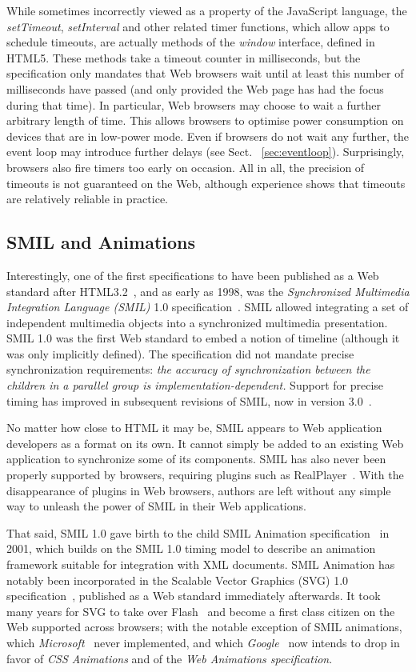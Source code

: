 While sometimes incorrectly viewed as a property of the JavaScript language,
the \emph{setTimeout}, \emph{setInterval} and other related timer functions,
which allow apps to schedule timeouts, are actually methods of the
\emph{window} interface, defined in HTML5. These methods take a timeout
counter in milliseconds, but the specification only mandates that Web browsers
wait until at least this number of milliseconds have passed (and only provided
the Web page has had the focus during that time). In particular, Web browsers
may choose to wait a further arbitrary length of time. This allows browsers to
optimise power consumption on devices that are in low-power mode. Even if
browsers do not wait any further, the event loop may introduce further delays
(see Sect. ~\ref{sec:eventloop}). Surprisingly, browsers also fire timers too
early on occasion. All in all, the precision of timeouts is not guaranteed on
the Web, although experience shows that timeouts are relatively reliable in
practice.

\subsection{SMIL and Animations}
\label{sec:smil}

Interestingly, one of the first specifications to have been published as a Web
standard after HTML3.2~\cite{html32}, and as early as 1998, was the
\emph{Synchronized Multimedia Integration Language (SMIL)} 1.0
specification~\cite{smil1}. SMIL allowed integrating a set of independent
multimedia objects into a synchronized multimedia presentation. SMIL 1.0 was
the first Web standard to embed a notion of timeline (although it was only
implicitly defined). The specification did not mandate precise synchronization
requirements: \emph{the accuracy of synchronization between the children in a
parallel group is implementation-dependent.} Support for precise timing has
improved in subsequent revisions of SMIL, now in version 3.0~\cite{smil3}.

No matter how close to HTML it may be, SMIL appears to Web application
developers as a format on its own. It cannot simply be added to an existing
Web application to synchronize some of its components. SMIL has also never
been properly supported by browsers, requiring plugins such as
RealPlayer~\cite{realplayer}. With the disappearance of plugins in Web
browsers, authors are left without any simple way to unleash the power of SMIL
in their Web applications.

That said, SMIL 1.0 gave birth to the child SMIL Animation specification~\cite{smilanimation}
in 2001, which builds on the SMIL 1.0 timing model to describe an animation
framework suitable for integration with XML documents. SMIL Animation has
notably been incorporated in the Scalable Vector Graphics (SVG) 1.0
specification~\cite{svg}, published as a Web standard immediately afterwards. It took many years for SVG to
take over Flash~\cite{flash} and become a first class citizen on the Web supported across
browsers; with the notable exception of SMIL animations, which \emph{Microsoft}~\cite{microsoft} never
implemented, and which \emph{Google}~\cite{google} now intends to drop in favor of \emph{CSS Animations}
and of the \emph{Web Animations specification}.

